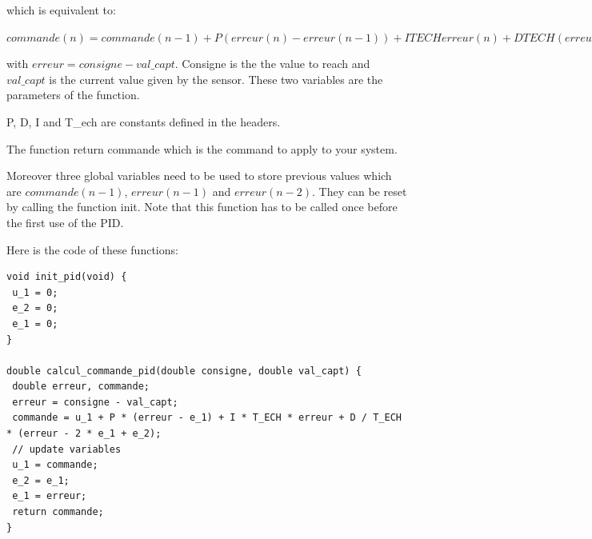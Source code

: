 which is equivalent to:

$commande(n) =commande(n-1)+P(erreur(n)-erreur(n-1))+ITECHerreur(n)+DTECH(erreur(n)-2*erreur(n-1)+erreur(n-2))$


with $erreur = consigne - val\_capt$. Consigne is the the value to reach and $val\_capt$ is the current value given by the sensor. These two variables are the parameters of the function.

P, D, I and T\_ech are constants defined in the headers.

The function return commande which is the command to apply to your system.

Moreover three global variables need to be used to store previous values which are $commande(n-1)$, $erreur(n-1)$ and $erreur(n-2)$. They can be reset by calling the function init. Note that this function has to be called once before the first use of the PID.

Here is the code of these functions:
\begin{lstlisting}
void init_pid(void) {
 u_1 = 0;
 e_2 = 0;
 e_1 = 0;
}

double calcul_commande_pid(double consigne, double val_capt) {
 double erreur, commande;
 erreur = consigne - val_capt;
 commande = u_1 + P * (erreur - e_1) + I * T_ECH * erreur + D / T_ECH * (erreur - 2 * e_1 + e_2);
 // update variables
 u_1 = commande;
 e_2 = e_1;
 e_1 = erreur;
 return commande;
}
\end{lstlisting}
